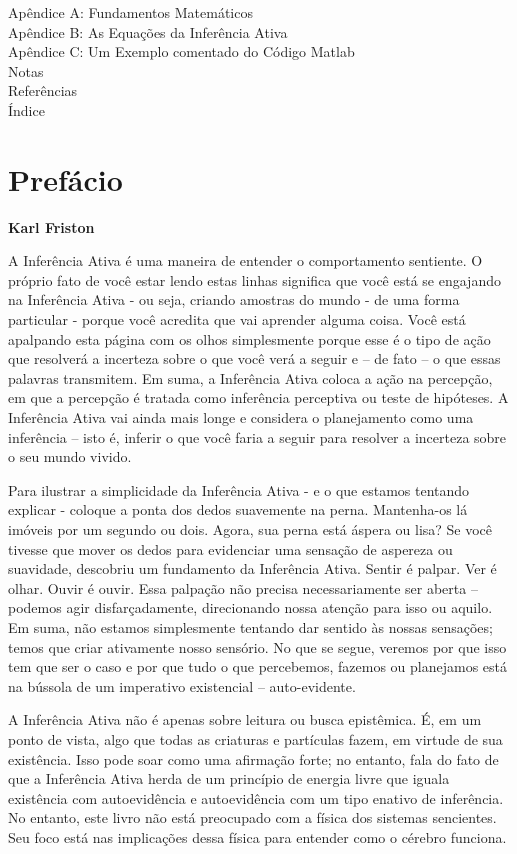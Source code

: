 \documentclass[
  12pt,
]{book}
\begin{document}
Apêndice A: Fundamentos Matemáticos\\
Apêndice B: As Equações da Inferência Ativa\\
Apêndice C: Um Exemplo comentado do Código Matlab\\
Notas\\
Referências\\
Índice

\hypertarget{prefuxe1cio}{%
\chapter*{Prefácio}\label{prefuxe1cio}}

\textbf{Karl Friston}

A Inferência Ativa é uma maneira de entender o comportamento sentiente. O próprio fato de você estar lendo estas linhas significa que você está se engajando na Inferência Ativa - ou seja, criando amostras do mundo - de uma forma particular - porque você acredita que vai aprender alguma coisa. Você está apalpando esta página com os olhos simplesmente porque esse é o tipo de ação que resolverá a incerteza sobre o que você verá a seguir e -- de fato -- o que essas palavras transmitem. Em suma, a Inferência Ativa coloca a ação na percepção, em que a percepção é tratada como inferência perceptiva ou teste de hipóteses. A Inferência Ativa vai ainda mais longe e considera o planejamento como uma inferência -- isto é, inferir o que você faria a seguir para resolver a incerteza sobre o seu mundo vivido.

Para ilustrar a simplicidade da Inferência Ativa - e o que estamos tentando explicar - coloque a ponta dos dedos suavemente na perna. Mantenha-os lá imóveis por um segundo ou dois. Agora, sua perna está áspera ou lisa? Se você tivesse que mover os dedos para evidenciar uma sensação de aspereza ou suavidade, descobriu um fundamento da Inferência Ativa. Sentir é palpar. Ver é olhar. Ouvir é ouvir. Essa palpação não precisa necessariamente ser aberta -- podemos agir disfarçadamente, direcionando nossa atenção para isso ou aquilo. Em suma, não estamos simplesmente tentando dar sentido às nossas sensações; temos que criar ativamente nosso sensório. No que se segue, veremos por que isso tem que ser o caso e por que tudo o que percebemos, fazemos ou planejamos está na bússola de um imperativo existencial -- auto-evidente.

A Inferência Ativa não é apenas sobre leitura ou busca epistêmica. É, em um ponto de vista, algo que todas as criaturas e partículas fazem, em virtude de sua existência. Isso pode soar como uma afirmação forte; no entanto, fala do fato de que a Inferência Ativa herda de um princípio de energia livre que iguala existência com autoevidência e autoevidência com um tipo enativo de inferência. No entanto, este livro não está preocupado com a física dos sistemas sencientes. Seu foco está nas implicações dessa física para entender como o cérebro funciona.
\end{document}
